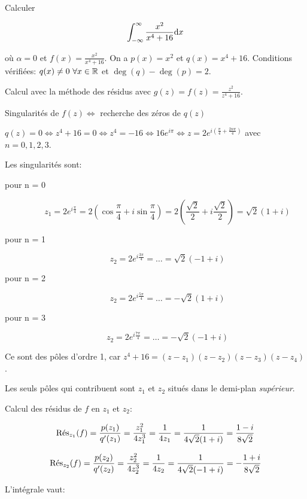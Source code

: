 \begin{enumerate}
\begin{example}[1]
Calculer

\[ \int_{-\infty}^\infty \frac{x^2}{x^4 + 16} \dx \]

où $\alpha = 0$ et $f(x) = \frac{x^2}{x^4 + 16}$.
On a $p(x) = x^2$ et $q(x) = x^4 + 16$.
Conditions vérifiées: $q(x) \neq 0 \ \forall x \in \R$ et $\deg(q) - \deg(p) = 2$.

Calcul avec la méthode des résidus avec $g(z) = f(z) = \frac{z^2}{z^4 + 16}$.

Singularités de $f(z) \iff$ recherche des zéros de $q(z)$

$q(z) = 0 \iff z^4 + 16 = 0 \iff z^4 = -16 \iff 16 e^{i\pi} \iff z = 2 e^{i\left(\frac{\pi}{4} + \frac{2n\pi}{4}\right)}$ avec $n = 0,1,2,3$.

Les singularités sont:

\begin{description}
    \item[pour n = 0]
        \[ z_1 = 2 e^{i\frac{\pi}{4}}
        = 2 \left( \cos \frac{\pi}{4} + i \sin \frac{\pi}{4}\right)
        = 2 \left( \frac{\sqrt{2}}{2} + i \frac{\sqrt{2}}{2} \right) = \sqrt{2} (1 + i)\]

    \item[pour n = 1]
        \[ z_2 = 2 e^{i\frac{3\pi}{4}} = \ldots = \sqrt{2} (-1 + i) \]

    \item[pour n = 2]
        \[ z_2 = 2 e^{i\frac{5\pi}{4}} = \ldots = - \sqrt{2} (1 + i) \]

    \item[pour n = 3]
        \[ z_2 = 2 e^{i\frac{7\pi}{4}} = \ldots = - \sqrt{2} (-1 + i) \]
\end{description}

Ce sont des pôles d'ordre 1, car $z^4 + 16 = (z - z_1) (z - z_2) (z - z_3) (z - z_4)$.

Les seuls pôles qui contribuent sont $z_1$ et $z_2$ situés dans le demi-plan \textit{supérieur}.

Calcul des résidus de $f$ en $z_1$ et $z_2$:

\[
    \Res_{z_1}(f) = \frac{p(z_1)}{q'(z_1)}
    = \frac{z_1^2}{4 z_1^3} = \frac{1}{4 z_1} = \frac{1}{4\sqrt{2}(1+i)} = \frac{1 - i}{8\sqrt{2}}
\]

\[
    \Res_{z_2}(f) = \frac{p(z_2)}{q'(z_2)}
    = \frac{z_2^2}{4 z_2^3} = \frac{1}{4 z_2} = \frac{1}{4\sqrt{2}(-1+i)} = - \frac{1 + i}{8\sqrt{2}}
\]

L'intégrale vaut:


\end{example}
\end{enumerate}
